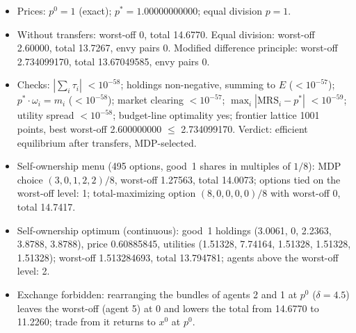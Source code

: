 \begin{itemize}[leftmargin=1.2em,itemsep=0pt,topsep=2pt]\footnotesize
\item Prices: $p^0 = 1$ (exact); $p^* = 1.00000000000$; equal division $p = 1$.
\item Without transfers: worst-off 0, total 14.6770. Equal division: worst-off 2.60000, total 13.7267, envy pairs 0. Modified difference principle: worst-off 2.734099170, total 13.67049585, envy pairs 0.
\item Checks: $|\sum_i\tau_i|$ $<10^{-58}$; holdings non-negative, summing to $E$ ($<10^{-57}$); $p^*\cdot\omega_i = m_i$ ($<10^{-58}$); market clearing $<10^{-57}$; $\max_i|\mathrm{MRS}_i - p^*|$ $<10^{-59}$; utility spread $<10^{-58}$; budget-line optimality yes; frontier lattice 1001 points, best worst-off 2.600000000 $\leq$ 2.734099170. Verdict: efficient equilibrium after transfers, MDP-selected.
\item Self-ownership menu (495 options, good~1 shares in multiples of $1/8$): MDP choice $(3, 0, 1, 2, 2)/8$, worst-off 1.27563, total 14.0073; options tied on the worst-off level: 1; total-maximizing option $(8, 0, 0, 0, 0)/8$ with worst-off 0, total 14.7417.
\item Self-ownership optimum (continuous): good~1 holdings (3.0061, 0, 2.2363, 3.8788, 3.8788), price 0.60885845, utilities (1.51328, 7.74164, 1.51328, 1.51328, 1.51328); worst-off 1.513284693, total 13.794781; agents above the worst-off level: 2.
\item Exchange forbidden: rearranging the bundles of agents 2 and 1 at $p^0$ ($\delta = 4.5$) leaves the worst-off (agent 5) at 0 and lowers the total from 14.6770 to 11.2260; trade from it returns to $x^0$ at $p^0$.
\end{itemize}
